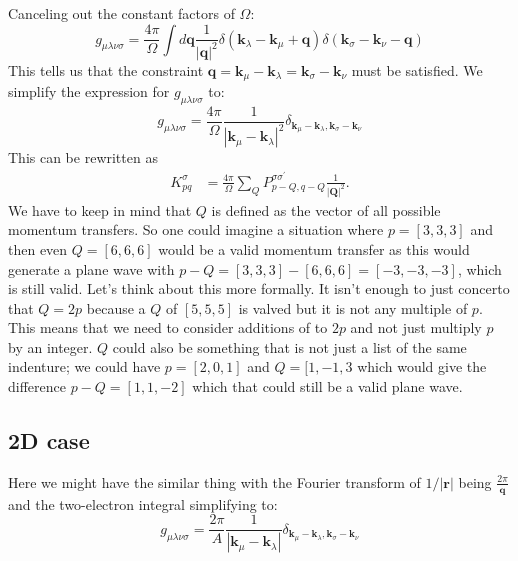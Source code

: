 \documentclass[12pt]{article}
\begin{document}
Canceling out the constant factors of $\Omega$:
\begin{equation}
    g_{\mu\lambda\nu\sigma} = \frac{4\pi}{\Omega} \int d\mathbf{q} \frac{1}{|\mathbf{q}|^2} \delta(\mathbf{k}_\lambda - \mathbf{k}_\mu + \mathbf{q}) \delta(\mathbf{k}_\sigma - \mathbf{k}_\nu - \mathbf{q})
\end{equation}
This tells us that the constraint $\mathbf{q} = \mathbf{k}_\mu - \mathbf{k}_\lambda = \mathbf{k}_\sigma - \mathbf{k}_\nu$ must be satisfied. We simplify the expression for $g_{\mu\lambda\nu\sigma}$ to:
\begin{equation}
    g_{\mu\lambda\nu\sigma} = \frac{4\pi}{\Omega} \frac{1}{|\mathbf{k}_\mu - \mathbf{k}_\lambda|^2} \delta_{\mathbf{k}_\mu - \mathbf{k}_\lambda, \mathbf{k}_\sigma - \mathbf{k}_\nu}
\end{equation}
This can be rewritten as
\begin{equation}
\begin{aligned}
K_{pq}^\sigma & = \frac{4 \pi}{\Omega} \sum_Q P_{p-Q, q-Q}^{\sigma \sigma^{\prime}} \frac{1}{\left|\mathbf{Q}\right|^2} .
\end{aligned}
\end{equation}
We have to keep in mind that $Q$ is defined as the vector of all possible momentum transfers. So one could imagine a situation where $p = [3,3,3]$ and then even $Q = [6,6,6]$ would be a valid momentum transfer as this would generate a plane wave with $p-Q = [3,3,3] - [6,6,6] = [-3,-3,-3]$, which is still valid. Let's think about this more formally. It isn't enough to just concerto that $Q=2p$ because a $Q$ of $[5,5,5]$ is valved but it is not any multiple of $p$. This means that we need to consider additions of to $2p$ and not just multiply $p$ by an integer. $Q$ could also be something that is not just a list of the same indenture; we could have $p = [2,0,1]$ and $Q = [1,-1,3$ which would give the difference $p-Q = [1,1,-2]$ which that could still be a valid plane wave. 

\subsection{2D case}
Here we might have the similar thing with the Fourier transform of $1/|\mathbf{r}|$ being $\frac{2\pi}{\mathbf{q}}$ and the two-electron integral simplifying to:
\begin{equation}
    g_{\mu\lambda\nu\sigma} = \frac{2\pi}{A} \frac{1}{|\mathbf{k}_\mu - \mathbf{k}_\lambda|} \delta_{\mathbf{k}_\mu - \mathbf{k}_\lambda, \mathbf{k}_\sigma - \mathbf{k}_\nu}
\end{equation}
\end{document}
